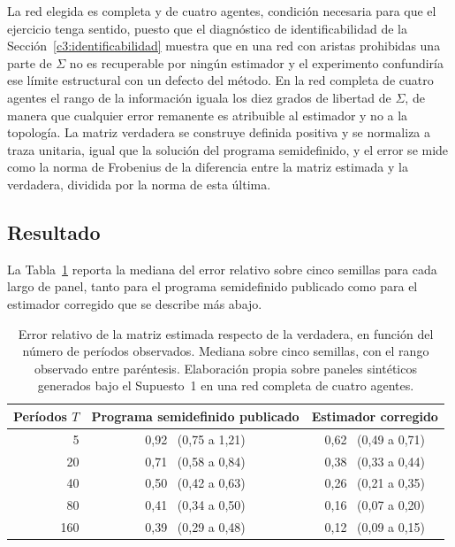 La red elegida es completa y de cuatro agentes, condición necesaria para que el
ejercicio tenga sentido, puesto que el diagnóstico de identificabilidad de la
Sección~\ref{c3:identificabilidad} muestra que en una red con aristas prohibidas
una parte de $\Sigma$ no es recuperable por ningún estimador y el experimento
confundiría ese límite estructural con un defecto del método. En la red completa
de cuatro agentes el rango de la información iguala los diez grados de libertad
de $\Sigma$, de manera que cualquier error remanente es atribuible al estimador
y no a la topología. La matriz verdadera se construye definida positiva y se
normaliza a traza unitaria, igual que la solución del programa semidefinido, y
el error se mide como la norma de Frobenius de la diferencia entre la matriz
estimada y la verdadera, dividida por la norma de esta última.

\subsection{Resultado}
\label{anexo:auditoria-resultado}

La Tabla~\ref{tab:auditoria-estimador} reporta la mediana del error relativo
sobre cinco semillas para cada largo de panel, tanto para el programa
semidefinido publicado como para el estimador corregido que se describe más
abajo.

\begin{table}[htbp]
\centering
\caption[Error relativo del estimador de Sigma segun el largo del panel]{Error
relativo de la matriz estimada respecto de la verdadera, en función del número de
períodos observados. Mediana sobre cinco semillas, con el rango observado entre
paréntesis. Elaboración propia sobre paneles sintéticos generados bajo el
Supuesto~1 en una red completa de cuatro agentes.}
\label{tab:auditoria-estimador}
\small
\begin{tabular}{rcc}
\hline
Períodos $T$ & Programa semidefinido publicado & Estimador corregido \\
\hline
5   & 0,92 \ (0,75 a 1,21) & 0,62 \ (0,49 a 0,71) \\
20  & 0,71 \ (0,58 a 0,84) & 0,38 \ (0,33 a 0,44) \\
40  & 0,50 \ (0,42 a 0,63) & 0,26 \ (0,21 a 0,35) \\
80  & 0,41 \ (0,34 a 0,50) & 0,16 \ (0,07 a 0,20) \\
160 & 0,39 \ (0,29 a 0,48) & 0,12 \ (0,09 a 0,15) \\
\hline
\end{tabular}
\end{table}


